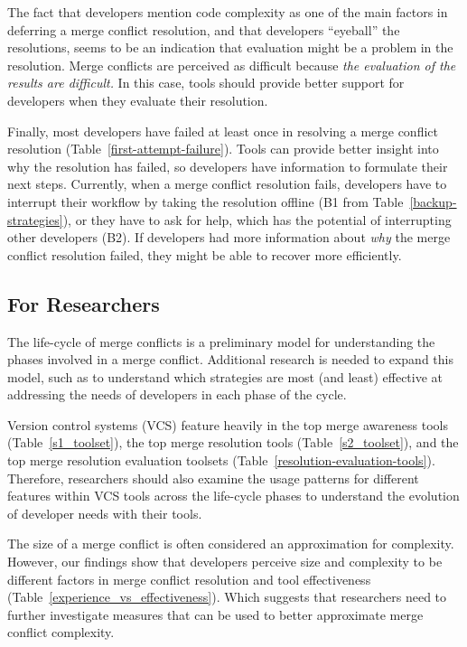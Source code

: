 The fact that developers mention code complexity as one of the main factors in deferring a merge conflict resolution, and that developers ``eyeball'' the resolutions, seems to be an indication that evaluation might be a problem in the resolution.
Merge conflicts are perceived as difficult because \emph{the evaluation of the results are difficult.}
In this case, tools should provide better support for developers when they evaluate their resolution.

Finally, most developers have failed at least once in resolving a merge conflict resolution (Table~\ref{first-attempt-failure}).
Tools can provide better insight into why the resolution has failed, so developers have information to formulate their next steps.
Currently, when a merge conflict resolution fails, developers have to interrupt their workflow by taking the resolution offline (B1 from Table~\ref{backup-strategies}), or they have to ask for help, which has the potential of interrupting other developers (B2).
If developers had more information about \emph{why} the merge conflict resolution failed, they might be able to recover more efficiently.

\subsection{For Researchers}
The life-cycle of merge conflicts is a preliminary model for understanding the phases involved in a merge conflict.
Additional research is needed to expand this model, such as to understand which strategies are most (and least) effective at addressing the needs of developers in each phase of the cycle.

Version control systems (VCS) feature heavily in the top merge awareness tools (Table~\ref{s1_toolset}), the top merge resolution tools (Table~\ref{s2_toolset}), and the top merge resolution evaluation toolsets (Table~\ref{resolution-evaluation-tools}).
Therefore, researchers should also examine the usage patterns for different features within VCS tools across the life-cycle phases to understand the evolution of developer needs with their tools.

The size of a merge conflict is often considered an approximation for complexity.
However, our findings show that developers perceive size and complexity to be different factors in merge conflict resolution and tool effectiveness (Table~\ref{experience_vs_effectiveness}).
Which suggests that researchers need to further investigate measures that can be used to better approximate merge conflict complexity.


